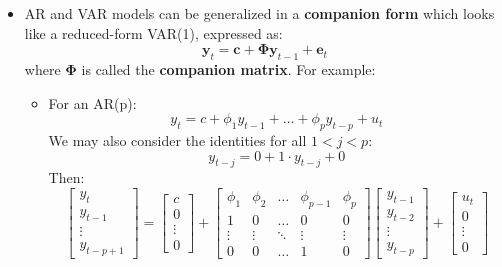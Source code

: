 \documentclass[notitlepage]{article}
\begin{document}
\begin{itemize}
    \item AR and VAR models can be generalized in a \textbf{companion form} which looks like a reduced-form VAR(1), expressed as:
    \[
    \mathbf{y}_t = \mathbf{c} + \boldsymbol{\Phi}\mathbf{y}_{t-1} + \mathbf{e}_t
    \]
    where \(\boldsymbol{\Phi}\) is called the \textbf{companion matrix}. For example:
    \begin{itemize}
        \item For an AR(p):
        \[
        y_t = c + \phi_1 y_{t-1} + \dots + \phi_p y_{t-p} + u_t
        \]
        We may also consider the identities for all \(1 <j < p\):
        \[
        y_{t-j} = 0 + 1 \cdot y_{t-j} + 0
        \]
        Then:
        \[
        \begin{bmatrix} y_t \\ y_{t-1} \\ \vdots \\ y_{t-p+1} \end{bmatrix} = 
        \begin{bmatrix} c \\ 0 \\ \vdots \\ 0 \end{bmatrix} + 
        \begin{bmatrix} \phi_1 & \phi_2 & \dots & \phi_{p-1} & \phi_p \\ 1 & 0 & \dots & 0 & 0 \\ \vdots & \vdots & \ddots & \vdots & \vdots \\ 0 & 0 & \dots & 1 & 0\end{bmatrix}
        \begin{bmatrix} y_{t-1} \\ y_{t-2} \\ \vdots \\ y_{t-p} \end{bmatrix} + 
        \begin{bmatrix} u_t \\ 0 \\ \vdots \\ 0 \end{bmatrix}
        \]
        

\end{itemize}
\end{itemize}
\end{document}
